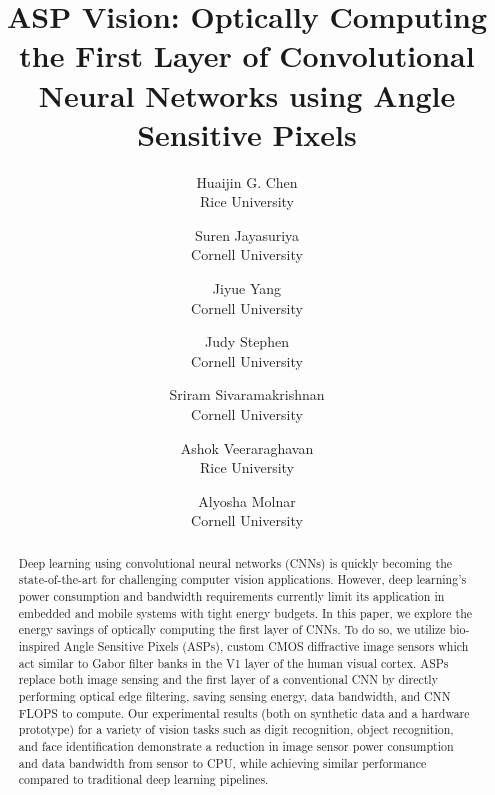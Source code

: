 \documentclass[10pt,twocolumn,letterpaper]{article}
\begin{document}
\title{ASP Vision: Optically Computing the First Layer of Convolutional Neural Networks using Angle Sensitive Pixels}


\author{Huaijin G. Chen\footnotemark[1]\\
Rice University\\
\and
Suren Jayasuriya\footnotemark[1]\\
Cornell University\\
\and
Jiyue Yang\\
Cornell University\\
\and
Judy Stephen\\
Cornell University\\
\and
Sriram Sivaramakrishnan\\
Cornell University\\
\and
Ashok Veeraraghavan\\
Rice University\\
\and
Alyosha Molnar\\
Cornell University\\
}

\maketitle
{}


\begin{abstract}
	Deep learning using convolutional neural networks (CNNs) is quickly becoming the state-of-the-art for challenging computer vision applications. However, deep learning's power consumption and bandwidth requirements currently limit its application in embedded and mobile systems with tight energy budgets. In this paper, we explore the energy savings of optically computing the first layer of CNNs. To do so, we utilize bio-inspired Angle Sensitive Pixels (ASPs), custom CMOS diffractive image sensors which act similar to Gabor filter banks in the V1 layer of the human visual cortex. ASPs replace both image sensing and the first layer of a conventional CNN by directly performing optical edge filtering, saving sensing energy, data bandwidth, and CNN FLOPS to compute. Our experimental results (both on synthetic data and a hardware prototype) for a variety of vision tasks such as digit recognition, object recognition, and face identification demonstrate a reduction in image sensor power consumption and data bandwidth from sensor to CPU, while achieving similar performance compared to traditional deep learning pipelines.


\end{abstract}
\end{document}
